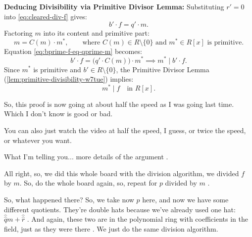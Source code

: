 \begin{proofWrapper}
\begin{content}
\textbf{Deducing Divisibility via Primitive Divisor Lemma:}
Substituting $r' = 0$ into \eqref{eq:cleared-div-f} gives:
\begin{equation}\label{eq:bprime-f-eq-qprime-m}
b' \cdot f = q' \cdot m.
\end{equation}
Factoring $m$ into its content and primitive part:
\[
m = C(m) \cdot m^*, \qquad \text{where } C(m) \in R \setminus \{0\} \text{ and } m^* \in R[x] \text{ is primitive}.
\]
Equation \eqref{eq:bprime-f-eq-qprime-m} becomes:
\[
b' \cdot f = \bigl(q' \cdot C(m)\bigr) \cdot m^* \implies m^* \mid b' \cdot f.
\]
Since $m^*$ is primitive and $b' \in R \setminus \{0\}$, the Primitive Divisor Lemma (\cref{lem:primitive-divisibility-w7tue}) implies:
\begin{equation}\label{eq:mstar-divides-f}
\boxed{m^* \mid f} \quad \text{in } R[x].
\end{equation}
\end{content}

\begin{hidden}
\end{hidden}

\begin{speech}[00:28:09 - 00:29:04]
So, this proof is now going at about half the speed as I was going last time. Which I don't know is good or bad.

You can also just watch the video at half the speed, I guess, or twice the speed, or whatever you want.

What I'm telling you... more details of the argument .
\end{speech}

\begin{speech}[00:29:04 - 00:30:34]
All right, so, we did this whole board with the division algorithm, we divided $f$ by $m$. So, do the whole board again, so, repeat for $p$ divided by $m$ .

So, what happened there? So, we take now $p$ here, and now we have some different quotients. They're double hats because we've already used one hat: $\hat{\hat{q}} m + \hat{\hat{r}}$ . And again, these two are in the polynomial ring with coefficients in the field, just as they were there . We just do the same division algorithm.


\end{speech}
\end{proofWrapper}
